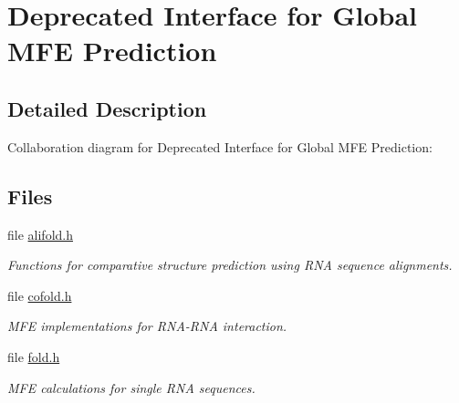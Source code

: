 \hypertarget{group__mfe__global__deprecated}{}\section{Deprecated Interface for Global M\+FE Prediction}
\label{group__mfe__global__deprecated}


\subsection{Detailed Description}
Collaboration diagram for Deprecated Interface for Global M\+FE Prediction\+:
\subsection*{Files}
\begin{DoxyCompactItemize}
\item 
file \mbox{\hyperlink{alifold_8h}{alifold.\+h}}
\begin{DoxyCompactList}\small\item\em Functions for comparative structure prediction using R\+NA sequence alignments. \end{DoxyCompactList}\item 
file \mbox{\hyperlink{cofold_8h}{cofold.\+h}}
\begin{DoxyCompactList}\small\item\em M\+FE implementations for R\+N\+A-\/\+R\+NA interaction. \end{DoxyCompactList}\item 
file \mbox{\hyperlink{fold_8h}{fold.\+h}}
\begin{DoxyCompactList}\small\item\em M\+FE calculations for single R\+NA sequences. \end{DoxyCompactList}\end{DoxyCompactItemize}
